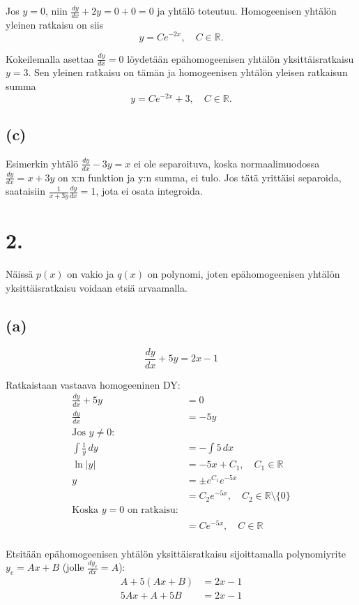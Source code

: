 \documentclass{article}
\begin{document}
Jos $y = 0$, niin $\frac{dy}{dx} + 2y = 0 + 0 = 0$ ja yhtälö toteutuu.
Homogeenisen yhtälön yleinen ratkaisu on siis
\[
  y = Ce^{-2x}, \quad C \in \mathbb{R}.
\]

Kokeilemalla asettaa $\frac{dy}{dx} = 0$ löydetään epähomogeenisen yhtälön
yksittäisratkaisu $y = 3$. Sen yleinen ratkaisu on tämän ja homogeenisen
yhtälön yleisen ratkaisun summa
\[
  y = Ce^{-2x} + 3, \quad C \in \mathbb{R}.
\]

\subsection*{(c)}

Esimerkin yhtälö $\frac{dy}{dx} - 3y = x$ ei ole separoituva, koska
normaalimuodossa $\frac{dy}{dx} = x + 3y$ on x:n funktion ja y:n summa, ei
tulo. Jos tätä yrittäisi separoida, saataisiin
$\frac{1}{x + 3y} \frac{dy}{dx} = 1$, jota ei osata integroida.

\section*{2.}

Näissä $p(x)$ on vakio ja $q(x)$ on polynomi, joten epähomogeenisen yhtälön
yksittäisratkaisu voidaan etsiä arvaamalla.

\subsection*{(a)}

\[
  \frac{dy}{dx} + 5y = 2x - 1
\]

Ratkaistaan vastaava homogeeninen DY:
\begin{align*}
  \frac{dy}{dx} + 5y &= 0 \\
  \frac{dy}{dx} &= -5y \\
  \text{Jos $y \neq 0$}: \\
  \int \frac{1}{y} \,dy &= -\int 5 \,dx \\
  \ln |y| &= -5x + C_1, \quad C_1 \in \mathbb{R} \\
  y &= \pm e^{C_1} e^{-5x} \\
    &= C_2 e^{-5x}, \quad C_2 \in \mathbb{R} \setminus \{0\} \\
  \text{Koska $y = 0$ on ratkaisu:} \\
    &= Ce^{-5x}, \quad C \in \mathbb{R} \\
\end{align*}

Etsitään epähomogeenisen yhtälön yksittäisratkaisu sijoittamalla polynomiyrite
$y_e = Ax + B$ (jolle $\frac{dy_e}{dx} = A$):
\begin{align*}
  A + 5(Ax + B) &= 2x - 1 \\
  5Ax + A + 5B &= 2x - 1 \\
\end{align*}
\end{document}

